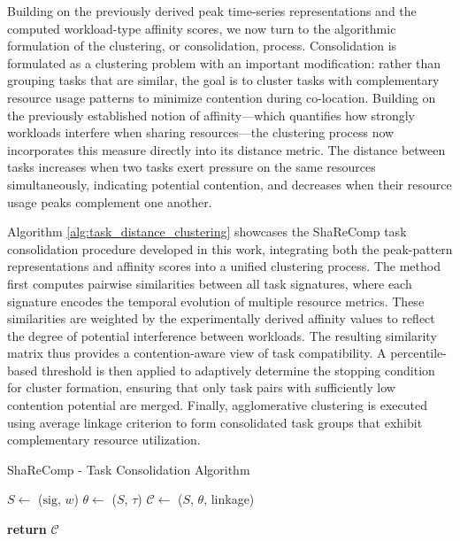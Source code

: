 \label{sec:algorithmic_approach_consolidation}

Building on the previously derived peak time-series representations and the computed workload-type affinity scores, we now turn to the algorithmic formulation of the clustering, or consolidation, process.
Consolidation is formulated as a clustering problem with an important modification: rather than grouping tasks that are similar, the goal is to cluster tasks with complementary resource usage patterns to minimize contention during co-location. Building on the previously established notion of affinity—which quantifies how strongly workloads interfere when sharing resources—the clustering process now incorporates this measure directly into its distance metric. The distance between tasks increases when two tasks exert pressure on the same resources simultaneously, indicating potential contention, and decreases when their resource usage peaks complement one another.

Algorithm \ref{alg:task_distance_clustering} showcases the ShaReComp task consolidation procedure developed in this work, integrating both the peak-pattern representations and affinity scores into a unified clustering process. The method first computes pairwise similarities between all task signatures, where each signature encodes the temporal evolution of multiple resource metrics. These similarities are weighted by the experimentally derived affinity values to reflect the degree of potential interference between workloads. The resulting similarity matrix thus provides a contention-aware view of task compatibility.
A percentile-based threshold is then applied to adaptively determine the stopping condition for cluster formation, ensuring that only task pairs with sufficiently low contention potential are merged. Finally, agglomerative clustering is executed using average linkage criterion to form consolidated task groups that exhibit complementary resource utilization.

\begin{algorithm}[H]
    \caption{ShaReComp - Task Consolidation Algorithm}
    \label{alg:task_distance_clustering}


    $S \gets$ \Sim($\mathrm{sig}$, $w$) 
    $\theta \gets$ \Thresh($S$, $\tau$) 
    $\mathcal{C} \gets$ \Merge($S$, $\theta$, linkage) 

    \textbf{return } $\mathcal{C}$
\end{algorithm}

